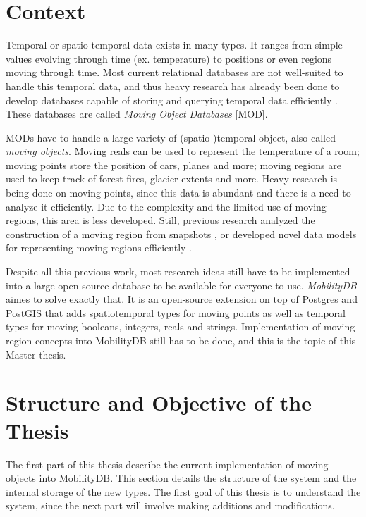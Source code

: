\section{Context}

Temporal or spatio-temporal data exists in many types. It ranges from simple values evolving through time (ex. temperature) to positions or even regions moving through time. Most current relational databases are not well-suited to handle this temporal data, and thus heavy research has already been done to develop databases capable of storing and querying temporal data efficiently . These databases are called \textit{Moving Object Databases} [MOD].

MODs have to handle a large variety of (spatio-)temporal object, also called \textit{moving objects}. Moving reals can be used to represent the temperature of a room; moving points store the position of cars, planes and more; moving regions are used to keep track of forest fires, glacier extents and more. Heavy research is being done on moving points, since this data is abundant and there is a need to analyze it efficiently. Due to the complexity and the limited use of moving regions, this area is less developed. Still, previous research analyzed the construction of a moving region from snapshots , or developed novel data models for representing moving regions efficiently .

Despite all this previous work, most research ideas still have to be implemented into a large open-source database to be available for everyone to use. \textit{MobilityDB}  aimes to solve exactly that. It is an open-source extension on top of Postgres  and PostGIS  that adds spatiotemporal types for moving points as well as temporal types for moving booleans, integers, reals and strings. Implementation of moving region concepts into MobilityDB still has to be done, and this is the topic of this Master thesis.

\section{Structure and Objective of the Thesis}

The first part of this thesis describe the current implementation of moving objects into MobilityDB. This section details the structure of the system and the internal storage of the new types. The first goal of this thesis is to understand the system, since the next part will involve making additions and modifications.

